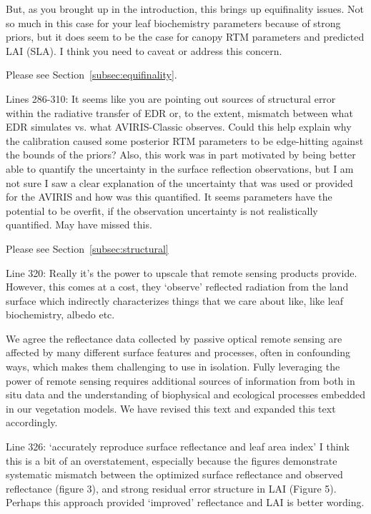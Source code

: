 \begin{reviewer}
  But, as you brought up in the introduction, this brings up equifinality issues. Not so much in this case for your leaf biochemistry parameters because of strong priors, but it does seem to be the case for canopy RTM parameters and predicted LAI (SLA). I think you need to caveat or address this concern.
\end{reviewer}

Please see Section~\ref{subsec:equifinality}.

\begin{reviewer}
  Lines 286-310: It seems like you are pointing out sources of structural error within the radiative transfer of EDR or, to the extent, mismatch between what EDR simulates vs. what AVIRIS-Classic observes. Could this help explain why the calibration caused some posterior RTM parameters to be edge-hitting against the bounds of the priors? Also, this work was in part motivated by being better able to quantify the uncertainty in the surface reflection observations, but I am not sure I saw a clear explanation of the uncertainty that was used or provided for the AVIRIS and how was this quantified. It seems parameters have the potential to be overfit, if the observation uncertainty is not realistically quantified. May have missed this.
\end{reviewer}

Please see Section~\ref{subsec:structural}

\begin{reviewer}
  Line 320: Really it’s the power to upscale that remote sensing products provide. However, this comes at a cost, they ‘observe’ reflected radiation from the land surface which indirectly characterizes things that we care about like, like leaf biochemistry, albedo etc.
\end{reviewer}

We agree the reflectance data collected by passive optical remote sensing are affected by many different surface features and processes, often in confounding ways, which makes them challenging to use in isolation.
Fully leveraging the power of remote sensing requires additional sources of information from both in situ data and the understanding of biophysical and ecological processes embedded in our vegetation models.
We have revised this text and expanded this text accordingly.

\begin{reviewer}
  Line 326: ‘accurately reproduce surface reflectance and leaf area index’ I think this is a bit of an overstatement, especially because the figures demonstrate systematic mismatch between the optimized surface reflectance and observed reflectance (figure 3), and strong residual error structure in LAI (Figure 5). Perhaps this approach provided ‘improved’ reflectance and LAI is better wording.
\end{reviewer}

